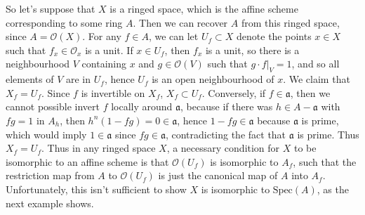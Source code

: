 So let's suppose that $X$ is a ringed space, which is the affine scheme corresponding to some ring $A$. Then we can recover $A$ from this ringed space, since $A = \mathcal{O}(X)$. For any $f \in A$, we can let $U_f \subset X$ denote the points $x \in X$ such that $f_x \in \mathcal{O}_x$ is a unit. If $x \in U_f$, then $f_x$ is a unit, so there is a neighbourhood $V$ containing $x$ and $g \in \mathcal{O}(V)$ such that $g \cdot f|_V = 1$, and so all elements of $V$ are in $U_f$, hence $U_f$ is an open neighbourhood of $x$. We claim that $X_f = U_f$. Since $f$ is invertible on $X_f$, $X_f \subset U_f$. Conversely, if $f \in \mathfrak{a}$, then we cannot possible invert $f$ locally around $\mathfrak{a}$, because if there was $h \in A - \mathfrak{a}$ with $fg = 1$ in $A_h$, then $h^n(1 - fg) = 0 \in \mathfrak{a}$, hence $1 - fg \in \mathfrak{a}$ because $\mathfrak{a}$ is prime, which would imply $1 \in \mathfrak{a}$ since $fg \in \mathfrak{a}$, contradicting the fact that $\mathfrak{a}$ is prime. Thus $X_f = U_f$. Thus in any ringed space $X$, a necessary condition for $X$ to be isomorphic to an affine scheme is that $\mathcal{O}(U_f)$ is isomorphic to $A_f$, such that the restriction map from $A$ to $\mathcal{O}(U_f)$ is just the canonical map of $A$ into $A_f$. Unfortunately, this isn't sufficient to show $X$ is isomorphic to $\text{Spec}(A)$, as the next example shows.

